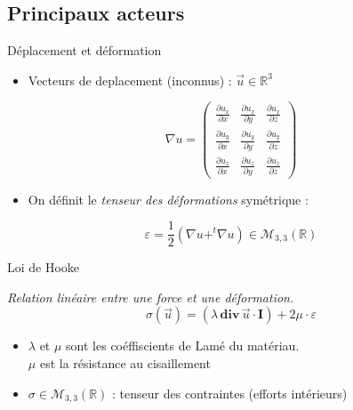 \documentclass[french]{beamer}
\begin{document}
\subsection{Principaux acteurs}
\begin{frame}{Déplacement et déformation}
  \begin{itemize}
    \item Vecteurs de deplacement (inconnus) : $\vec{u} \in \mathbb{R}^3 $
  \end{itemize}
  \pause
  \vspace{2pt}

  \begin{equation}
    \nabla u =  
    \left(
    \begin{array}{ccc}
      \frac{\partial u_x}{\partial x } & \frac{\partial u_x}{\partial y } & 
      \frac{\partial u_x}{\partial z }  \\
      \frac{\partial u_y}{\partial x } & \frac{\partial u_y}{\partial y } & 
      \frac{\partial u_y}{\partial z }  \\
      \frac{\partial u_z}{\partial x } & \frac{\partial u_z}{\partial y } & 
      \frac{\partial u_z}{\partial z } 
    \end{array}
    \right)
  \end{equation}
  \pause
  \vspace{2pt}
  \begin{itemize}
    \item On définit le \emph{tenseur des déformations} symétrique : 
  \end{itemize}

  \begin{equation}
    \boxed{\varepsilon = \frac{1}{2} \left( \nabla u + ^{t} \nabla u \right)} 
    \in \mathcal{M}_{3,3}(\mathbb{R})
  \end{equation}

\end{frame}


\begin{frame}{Loi de Hooke}

   \emph{Relation linéaire entre une force et une déformation.}
   \pause
  \begin{equation}
    \sigma \left(\vec{u}\right) = \left( \lambda \hspace{2pt}\mathbf{div} 
    \hspace{2pt}\vec{u} \cdot \mathbf{I} \right) + 2 \mu\cdot \varepsilon 
  \end{equation}
  \begin{itemize}
      \pause
    \item $\lambda$ et $\mu$ sont les coéffiscients de Lamé du matériau. \\
      \pause
      $\mu$ est la résistance au cisaillement 
      \pause
     \item $\sigma \in \mathcal{M}_{3,3}(\mathbb{R})$ : tenseur des contraintes (efforts intérieurs)
    
  \end{itemize}
\end{frame}
\end{document}
